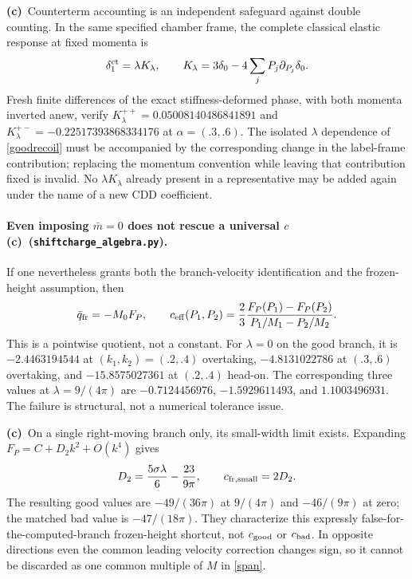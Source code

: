 \documentclass[11pt,a4paper]{article}
\newcommand{\C}{\textbf{(c)}\ }
\newcommand{\file}[1]{\nolinkurl{#1}}
\newcommand{\alg}{\file{shiftcharge_algebra.py}}
\begin{document}
\C Counterterm accounting is an independent safeguard against double
counting. In the same specified chamber frame, the complete classical
elastic response at fixed momenta is
\begin{equation}
 \delta_1^{\rm ct}=\lambda K_\lambda,\qquad
 K_\lambda=3\delta_0-4\sum_jP_j\partial_{P_j}\delta_0.
\end{equation}
Fresh finite differences of the exact stiffness-deformed phase, with both
momenta inverted anew, verify $K_\lambda^{++}=0.05008140486841891$ and
$K_\lambda^{+-}=-0.22517393868334176$ at $\alpha=(.3,.6)$.
The isolated $\lambda$ dependence of \eqref{goodrecoil} must be accompanied
by the corresponding change in the label-frame contribution; replacing
the momentum convention while leaving that contribution fixed is invalid.
No $\lambda K_\lambda$ already present in a representative may be added again
under the name of a new CDD coefficient.

\paragraph{Even imposing $\bar m=0$ does not rescue a universal $c$ \C (\alg).}
If one nevertheless grants both the branch-velocity identification and
the frozen-height assumption, then
\begin{equation}
 \bar q_{\rm fr}=-M_0 F_P,\qquad
 c_{\rm eff}(P_1,P_2)=\frac23\frac{F_P(P_1)-F_P(P_2)}{P_1/M_1-P_2/M_2}.
\end{equation}
This is a pointwise quotient, not a constant. For $\lambda=0$ on the good
branch, it is $-2.4463194544$ at $(k_1,k_2)=(.2,.4)$ overtaking,
$-4.8131022786$ at $(.3,.6)$ overtaking, and $-15.8575027361$ at
$(.2,.4)$ head-on. The corresponding three values at
$\lambda=9/(4\pi)$ are $-0.7124456976$, $-1.5929611493$, and
$1.1003496931$. The failure is structural, not a numerical tolerance issue.

\C On a single right-moving branch only, its small-width limit exists.
Expanding $F_P=C+D_2k^2+O(k^4)$ gives
\begin{equation}
 D_2=\frac{5\sigma\lambda}{6}-\frac{23}{9\pi},\qquad
 c_{{\rm fr},\rm small}=2D_2.
\end{equation}
The resulting good values are $-49/(36\pi)$ at $9/(4\pi)$ and
$-46/(9\pi)$ at zero; the matched bad value is $-47/(18\pi)$.
They characterize this expressly false-for-the-computed-branch
frozen-height shortcut, not $c_{\rm good}$ or $c_{\rm bad}$.
In opposite directions even the common leading velocity correction changes
sign, so it cannot be discarded as one common multiple of $M$ in
\eqref{span}.
\end{document}
